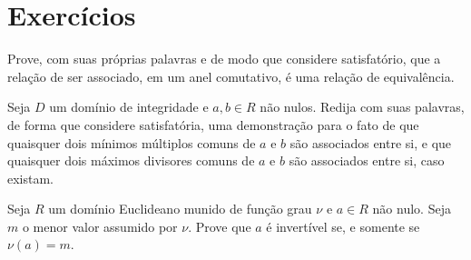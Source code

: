 \section{Exercícios}

\begin{exer}
    Prove, com suas próprias palavras e de modo que considere satisfatório, que a relação de ser associado, em um anel comutativo, é uma relação de equivalência.
\end{exer}

\begin{exer}
    Seja $D$ um domínio de integridade e $a, b \in R$ não nulos.
    Redija com suas palavras, de forma que considere satisfatória, uma demonstração para o fato de que quaisquer dois mínimos múltiplos comuns de $a$ e $b$ são associados entre si, e que quaisquer dois máximos divisores comuns de $a$ e $b$ são associados entre si, caso existam.
\end{exer}
\begin{exer}
    Seja $R$ um domínio Euclideano munido de função grau $\nu$ e $a \in R$ não nulo.
    Seja $m$ o menor valor assumido por $\nu$.
    Prove que $a$ é invertível se, e somente se $\nu(a)=m$.
\end{exer}

